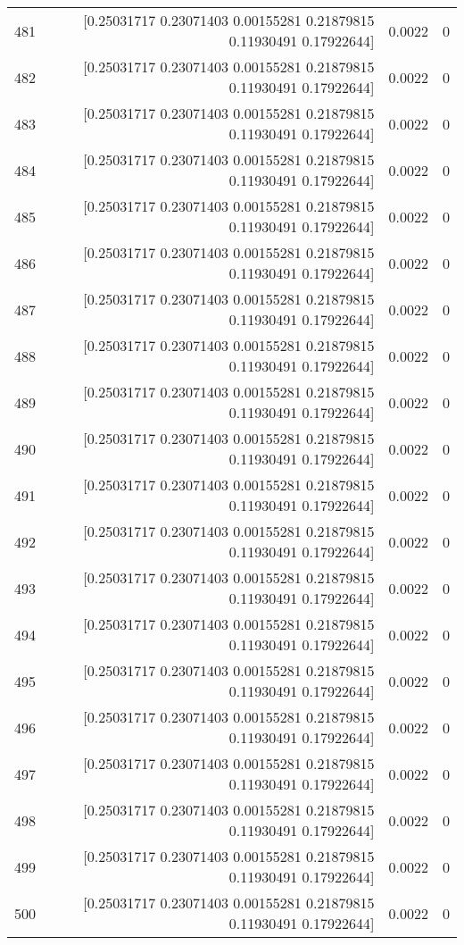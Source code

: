 \begin{longtable}{lrrr}
481 & [0.25031717 0.23071403 0.00155281 0.21879815 0.11930491 0.17922644] & 0.0022 & 0 \\
482 & [0.25031717 0.23071403 0.00155281 0.21879815 0.11930491 0.17922644] & 0.0022 & 0 \\
483 & [0.25031717 0.23071403 0.00155281 0.21879815 0.11930491 0.17922644] & 0.0022 & 0 \\
484 & [0.25031717 0.23071403 0.00155281 0.21879815 0.11930491 0.17922644] & 0.0022 & 0 \\
485 & [0.25031717 0.23071403 0.00155281 0.21879815 0.11930491 0.17922644] & 0.0022 & 0 \\
486 & [0.25031717 0.23071403 0.00155281 0.21879815 0.11930491 0.17922644] & 0.0022 & 0 \\
487 & [0.25031717 0.23071403 0.00155281 0.21879815 0.11930491 0.17922644] & 0.0022 & 0 \\
488 & [0.25031717 0.23071403 0.00155281 0.21879815 0.11930491 0.17922644] & 0.0022 & 0 \\
489 & [0.25031717 0.23071403 0.00155281 0.21879815 0.11930491 0.17922644] & 0.0022 & 0 \\
490 & [0.25031717 0.23071403 0.00155281 0.21879815 0.11930491 0.17922644] & 0.0022 & 0 \\
491 & [0.25031717 0.23071403 0.00155281 0.21879815 0.11930491 0.17922644] & 0.0022 & 0 \\
492 & [0.25031717 0.23071403 0.00155281 0.21879815 0.11930491 0.17922644] & 0.0022 & 0 \\
493 & [0.25031717 0.23071403 0.00155281 0.21879815 0.11930491 0.17922644] & 0.0022 & 0 \\
494 & [0.25031717 0.23071403 0.00155281 0.21879815 0.11930491 0.17922644] & 0.0022 & 0 \\
495 & [0.25031717 0.23071403 0.00155281 0.21879815 0.11930491 0.17922644] & 0.0022 & 0 \\
496 & [0.25031717 0.23071403 0.00155281 0.21879815 0.11930491 0.17922644] & 0.0022 & 0 \\
497 & [0.25031717 0.23071403 0.00155281 0.21879815 0.11930491 0.17922644] & 0.0022 & 0 \\
498 & [0.25031717 0.23071403 0.00155281 0.21879815 0.11930491 0.17922644] & 0.0022 & 0 \\
499 & [0.25031717 0.23071403 0.00155281 0.21879815 0.11930491 0.17922644] & 0.0022 & 0 \\
500 & [0.25031717 0.23071403 0.00155281 0.21879815 0.11930491 0.17922644] & 0.0022 & 0 \\
\end{longtable}
